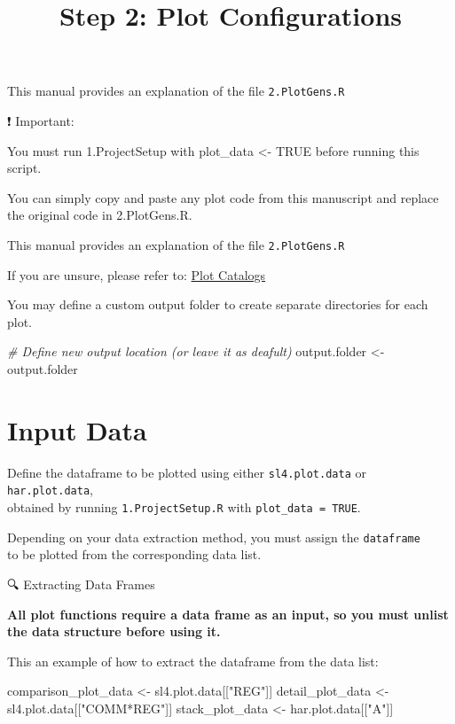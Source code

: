 \documentclass[
]{article}
\title{Step 2: Plot Configurations}
\author{}
\date{\vspace{-2.5em}}
\newenvironment{Shaded}{\begin{snugshade}}{\end{snugshade}}
\newcommand{\CommentTok}[1]{\textcolor[rgb]{0.56,0.35,0.01}{\textit{#1}}}
\newcommand{\NormalTok}[1]{#1}
\newcommand{\OtherTok}[1]{\textcolor[rgb]{0.56,0.35,0.01}{#1}}
\newcommand{\StringTok}[1]{\textcolor[rgb]{0.31,0.60,0.02}{#1}}
\begin{document}
\maketitle

This manual provides an explanation of the file \texttt{2.PlotGens.R}

❗ Important:

You must run 1.ProjectSetup with plot\_data \textless- TRUE before
running this script.

You can simply copy and paste any plot code from this manuscript and
replace the original code in 2.PlotGens.R.

This manual provides an explanation of the file \texttt{2.PlotGens.R}

If you are unsure, please refer to:
\href{https://pattawee.shinyapps.io/gtapviz-advanced-plot-configs/}{Plot
Catalogs}

You may define a custom output folder to create separate directories for
each plot.

\begin{Shaded}
\begin{Highlighting}[]
\CommentTok{\# Define new output location (or leave it as deafult)}
\NormalTok{output.folder }\OtherTok{\textless{}{-}}\NormalTok{ output.folder}
\end{Highlighting}
\end{Shaded}

\section*{Input Data}\label{input-data}

Define the dataframe to be plotted using either \texttt{sl4.plot.data}
or \texttt{har.plot.data},\\
obtained by running \texttt{1.ProjectSetup.R} with
\texttt{plot\_data\ =\ TRUE}.

Depending on your data extraction method, you must assign the
\texttt{dataframe}\\
to be plotted from the corresponding data list.

🔍 Extracting Data Frames

\textbf{All plot functions require a data frame as an input, so you must
unlist the data structure before using it.}

This an example of how to extract the dataframe from the data list:

\begin{Shaded}
\begin{Highlighting}[]
\NormalTok{comparison\_plot\_data }\OtherTok{\textless{}{-}}\NormalTok{ sl4.plot.data[[}\StringTok{"REG"}\NormalTok{]]     }
\NormalTok{detail\_plot\_data }\OtherTok{\textless{}{-}}\NormalTok{ sl4.plot.data[[}\StringTok{"COMM*REG"}\NormalTok{]]     }
\NormalTok{stack\_plot\_data }\OtherTok{\textless{}{-}}\NormalTok{ har.plot.data[[}\StringTok{"A"}\NormalTok{]]}
\end{Highlighting}
\end{Shaded}
\end{document}
